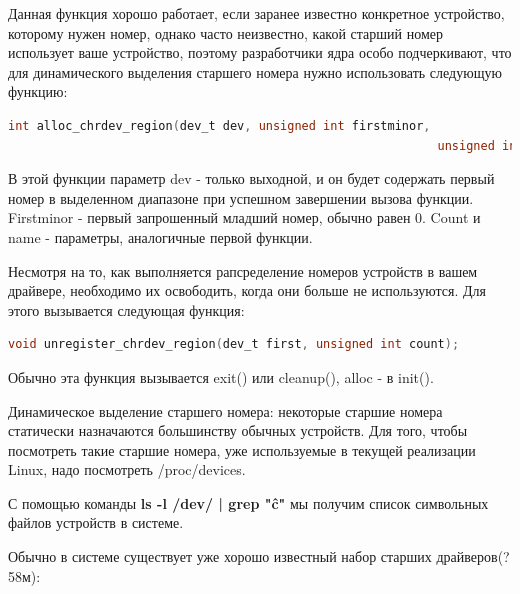 \documentclass[12pt,a4paper]{scrreprt}
\begin{document}
Данная функция хорошо работает, если заранее известно конкретное устройство, которому нужен номер, однако часто неизвестно, какой старший номер использует ваше устройство, поэтому разработчики ядра особо подчеркивают, что для динамического выделения старшего номера нужно использовать следующую функцию:

\begin{lstlisting}[language=C]
int alloc_chrdev_region(dev_t dev, unsigned int firstminor, 
															unsigned int count, char *name);
\end{lstlisting}

В этой функции параметр dev - только выходной, и он будет содержать первый номер в выделенном диапазоне при успешном завершении вызова функции. Firstminor - первый запрошенный младший номер, обычно равен 0. Count и name - параметры, аналогичные первой функции.

Несмотря на то, как выполняется рапсределение номеров устройств в вашем драйвере, необходимо их освободить, когда они больше не используются. Для этого вызывается следующая функция:

\begin{lstlisting}[language=C]
void unregister_chrdev_region(dev_t first, unsigned int count);
\end{lstlisting}

Обычно эта функция вызывается exit() или cleanup(), alloc - в init().

Динамическое выделение старшего номера: некоторые старшие номера статически назначаются большинству обычных устройств. Для того, чтобы посмотреть такие старшие номера, уже используемые в текущей реализации Linux, надо посмотреть /proc/devices.

С помощью команды \textbf{ls -l /dev/ | grep "\^c"} мы получим список символьных файлов устройств в системе. 

Обычно в системе существует уже хорошо известный набор старших драйверов(?58м):

\begin{figure}[!h]
\end{figure}
\end{document}
